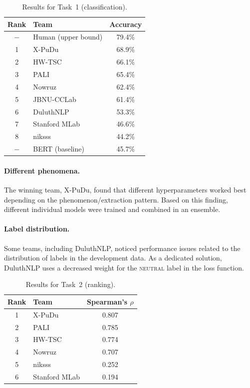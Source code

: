 \documentclass[11pt]{article}
\begin{document}
\begin{table}
    \centering
    \begin{tabular}{clc}
    \toprule
    Rank & Team & Accuracy\\
    \midrule
    $-$ & Human (upper bound) & 79.4\%\\
    \midrule
    1 & X-PuDu & 68.9\% \\
    2 & HW-TSC & 66.1\% \\
    3 & PALI   & 65.4\% \\
    4 & Nowruz & 62.4\% \\
    5 & JBNU-CCLab & 61.4\% \\
    6 & DuluthNLP & 53.3\% \\
    7 & Stanford MLab & 46.6\% \\
    8 & niksss & 44.2\% \\
    \midrule
    $-$ & BERT (baseline) & 45.7\% \\
 \bottomrule
    \end{tabular}
    \caption{Results for Task~1 (classification).}
    \label{tab:task1results}
\end{table}

\paragraph{Different phenomena.} The winning team, X-PuDu, found that different hyperparameters worked best depending on the phenomenon/extraction pattern. Based on this finding, different individual models were trained and combined in an ensemble.

\paragraph{Label distribution.} Some teams, including DuluthNLP, noticed performance issues related to the distribution of labels in the development data. As a dedicated solution, DuluthNLP uses a decreased weight for the \textsc{neutral} label in the loss function.

\begin{table}
    \centering
    \begin{tabular}{clc}
    \toprule
    Rank & Team & Spearman's $\rho$\\
    \midrule
    1 & X-PuDu & 0.807 \\
    2 & PALI & 0.785 \\
    3 & HW-TSC & 0.774 \\
    4 & Nowruz & 0.707 \\
    5 & niksss & 0.252 \\
    6 & Stanford MLab & 0.194 \\
    \bottomrule
    \end{tabular}
    \caption{Results for Task~2 (ranking).}
    \label{tab:task2results}
\end{table}
\end{document}
